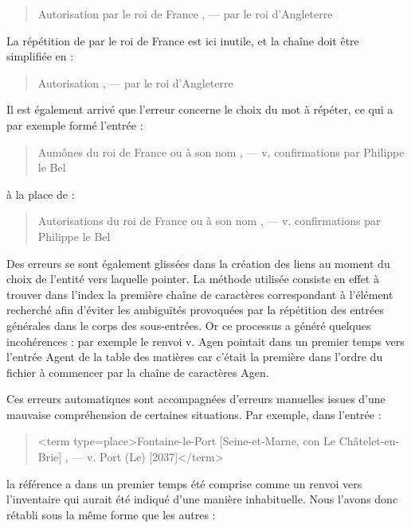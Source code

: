 \documentclass[a4paper,12pt,twoside]{book}
\begin{document}
	\begin{quotation}
		Autorisation par le roi de France , — par le roi d’Angleterre
	\end{quotation}
	
	\noindent La répétition de \og par le roi de France\fg{} est ici inutile, et la chaîne doit être simplifiée en :
	
	\begin{quotation}
		Autorisation , — par le roi d’Angleterre
	\end{quotation}

	\noindent Il est également arrivé que l'erreur concerne le choix du mot à répéter, ce qui a par exemple formé l'entrée :

	\begin{quotation}
		Aumônes du roi de France ou à son nom , — v. confirmations par Philippe le
	Bel
	\end{quotation}
	
	\noindent à la place de :
	
	\begin{quotation}
		Autorisations du roi de France ou à son nom , — v. confirmations par Philippe le	Bel
	\end{quotation}

	Des erreurs se sont également glissées dans la création des liens au moment du choix de l'entité vers laquelle pointer. La méthode utilisée consiste en effet à trouver dans l'index la première chaîne de caractères correspondant à l'élément recherché afin d'éviter les ambiguïtés provoquées par la répétition des entrées générales dans le corps des sous-entrées. Or ce processus a généré quelques incohérences : par exemple le renvoi \og v. Agen\fg{} pointait dans un premier temps vers l'entrée \og Agent\fg{} de la table des matières car c'était la première dans l'ordre du fichier à commencer par la chaîne de caractères \og Agen\fg{}.
	
	Ces erreurs automatiques sont accompagnées d'erreurs manuelles issues d'une mauvaise compréhension de certaines situations. Par exemple, dans l'entrée :
	
	\begin{quotation}
		<term type=\textquotesingle place\textquotesingle >Fontaine-le-Port [Seine-et-Marne, con Le Châtelet-en-Brie] , —
			v. Port (Le) [2037]</term>
	\end{quotation}
	
	\noindent la référence \fg{} a dans un premier temps été comprise comme un renvoi vers l'inventaire qui aurait été indiqué d'une manière inhabituelle. Nous l'avons donc rétabli sous la même forme que les autres :
	
\end{document}
